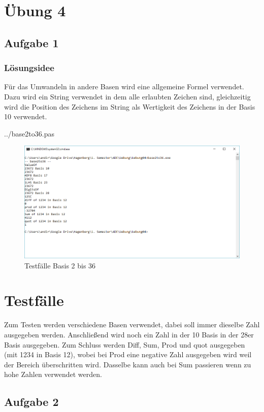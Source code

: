 \section*{Übung 4}
\subsection*{Aufgabe 1}
\subsubsection*{Lösungsidee}
Für das Umwandeln in andere Basen wird eine allgemeine Formel verwendet. Dazu wird ein String verwendet in dem alle erlaubten Zeichen sind, gleichzeitig wird die Position des Zeichens im String als Wertigkeit des Zeichens in der Basis 10 verwendet.

 {../base2to36.pas}
\begin{figure}[H]
	\centering
	\includegraphics[scale=0.75]{./pictures/base2to36.png}
	\caption{Testfälle Basis 2 bis 36}
	\label{fig: Spannweiten Berechnung}
\end{figure}

\section*{Testfälle}
Zum Testen werden verschiedene Basen verwendet, dabei soll immer dieselbe Zahl ausgegeben werden.
Anschließend wird noch ein Zahl in der 10 Basis in der 28er Basis ausgegeben. Zum Schluss werden Diff, Sum, Prod und quot ausgegeben (mit 1234 in Basis 12), wobei bei Prod eine negative Zahl ausgegeben wird weil der Bereich überschritten wird. Dasselbe kann auch bei Sum passieren wenn zu hohe Zahlen verwendet werden.

\newpage

\subsection*{Aufgabe 2}
